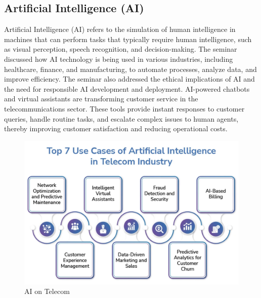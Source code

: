 \documentclass[conference]{IEEEtran}
\begin{document}
\subsection{Artificial Intelligence (AI)}
Artificial Intelligence (AI) refers to the simulation of human intelligence in machines that can perform tasks that typically require human intelligence, such as visual perception, speech recognition, and decision-making. The seminar discussed how AI technology is being used in various industries, including healthcare, finance, and manufacturing, to automate processes, analyze data, and improve efficiency. The seminar also addressed the ethical implications of AI and the need for responsible AI development and deployment. \cite{BALMER2020101977} AI-powered chatbots and virtual assistants are transforming customer service in the telecommunications sector. These tools provide instant responses to customer queries, handle routine tasks, and escalate complex issues to human agents, thereby improving customer satisfaction and reducing operational costs. 
\begin{figure}[htbp]
    \centering
    \includegraphics[width=\linewidth]{images/ai.png}
    \caption{AI on Telecom}
    \label{fig:ai-telecom}
\end{figure}
\end{document}
